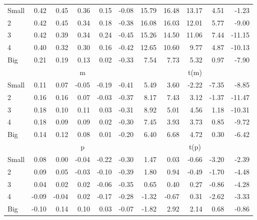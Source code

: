 \begin{tabular}{lrrrrrrrrrr}
    Small   & 0.42  & 0.45  & 0.36  & 0.15  & -0.08  & 15.79  & 16.48  & 13.17  & 4.51  & -1.23  \\
         2  & 0.42  & 0.45  & 0.34  & 0.18  & -0.38  & 16.08  & 16.03  & 12.01  & 5.77  & -9.00  \\
         3  & 0.42  & 0.39  & 0.34  & 0.24  & -0.45  & 15.26  & 14.50  & 11.06  & 7.44  & -11.15  \\
         4  & 0.40  & 0.32  & 0.30  & 0.16  & -0.42  & 12.65  & 10.60  & 9.77  & 4.87  & -10.13  \\
    Big     & 0.21  & 0.19  & 0.13  & 0.02  & -0.33  & 7.54  & 7.73  & 5.32  & 0.97  & -7.90  \\

  
    
      & \multicolumn{5}{c}{m} & \multicolumn{5}{c}{t(m)}
    
    \\
      \cmidrule(r){2-6} \cmidrule(r){7-11}

    Small   & 0.11  & 0.07  & -0.05  & -0.19  & -0.41  & 5.49  & 3.60  & -2.22  & -7.35  & -8.85  \\
         2  & 0.16  & 0.16  & 0.07  & -0.03  & -0.37  & 8.17  & 7.43  & 3.12  & -1.37  & -11.47  \\
         3  & 0.18  & 0.10  & 0.11  & 0.03  & -0.31  & 8.92  & 5.01  & 4.56  & 1.18  & -10.31  \\
         4  & 0.18  & 0.09  & 0.09  & 0.02  & -0.30  & 7.45  & 3.93  & 3.73  & 0.85  & -9.72  \\
    Big     & 0.14  & 0.12  & 0.08  & 0.01  & -0.20  & 6.40  & 6.68  & 4.72  & 0.30  & -6.42  \\

  
    
      & \multicolumn{5}{c}{p} & \multicolumn{5}{c}{t(p)}
    
    \\
      \cmidrule(r){2-6} \cmidrule(r){7-11}

    Small   & 0.08  & 0.00  & -0.04  & -0.22  & -0.30  & 1.47  & 0.03  & -0.66  & -3.20  & -2.39  \\
         2  & 0.09  & 0.05  & -0.03  & -0.10  & -0.39  & 1.80  & 0.94  & -0.49  & -1.70  & -4.48  \\
         3  & 0.04  & 0.02  & 0.02  & -0.06  & -0.35  & 0.65  & 0.40  & 0.27  & -0.86  & -4.28  \\
         4  & -0.09  & -0.04  & 0.02  & -0.17  & -0.28  & -1.32  & -0.67  & 0.31  & -2.62  & -3.33  \\
    Big     & -0.10  & 0.14  & 0.10  & 0.03  & -0.07  & -1.82  & 2.92  & 2.14  & 0.68  & -0.86  \\

  

  \bottomrule
\end{tabular}
